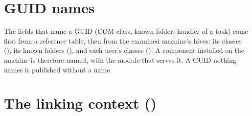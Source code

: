 \documentclass[11pt,a4paper,oneside]{report}
\begin{document}
\section{GUID names}

The fields that name a GUID (COM class, known folder, handler of a task) come
first from a reference table, then from the examined machine's hives: its
classes (), its
known folders (), and each user's classes
(). A component installed on the machine is therefore
named, with the module that serves it. A GUID nothing names is published
without a name.

\section{The linking context ()}
\end{document}
